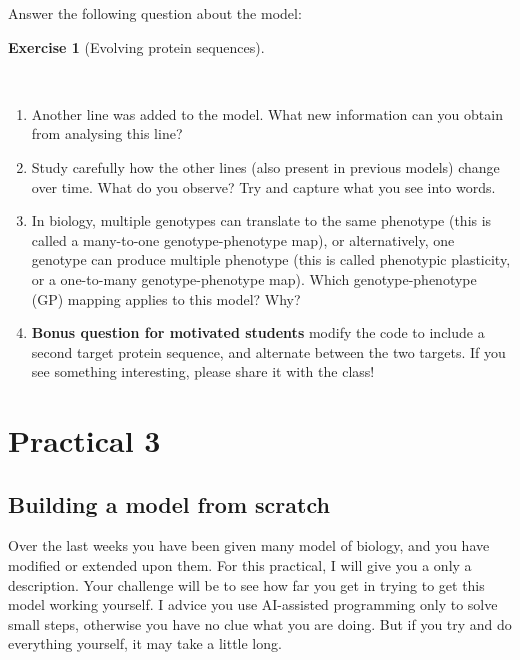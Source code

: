 \documentclass[
  letterpaper,
  DIV=11,
  numbers=noendperiod]{scrreprt}
\providecommand{\tightlist}{%
  \setlength{\itemsep}{0pt}\setlength{\parskip}{0pt}}\usepackage{longtable,booktabs,array}
\theoremstyle{definition}
\newtheorem{exercise}{Exercise}[chapter]
\theoremstyle{remark}
\begin{document}
Answer the following question about the model:

\begin{exercise}[Evolving protein
sequences]\protect\hypertarget{exr-evolving-proteins}{}\label{exr-evolving-proteins}

~

\begin{enumerate}
\def\labelenumi{\alph{enumi}.}
\tightlist
\item
  Another line was added to the model. What new information can you
  obtain from analysing this line?
\item
  Study carefully how the other lines (also present in previous models)
  change over time. What do you observe? Try and capture what you see
  into words.
\item
  In biology, multiple genotypes can translate to the same phenotype
  (this is called a many-to-one genotype-phenotype map), or
  alternatively, one genotype can produce multiple phenotype (this is
  called phenotypic plasticity, or a one-to-many genotype-phenotype
  map). Which genotype-phenotype (GP) mapping applies to this model?
  Why?
\item
  \textbf{Bonus question for motivated students} modify the code to
  include a second target protein sequence, and alternate between the
  two targets. If you see something interesting, please share it with
  the class!
\end{enumerate}

\end{exercise}

\chapter{Practical 3}\label{practical-3-1}

\section{Building a model from
scratch}\label{building-a-model-from-scratch}

Over the last weeks you have been given many model of biology, and you
have modified or extended upon them. For this practical, I will give you
a only a description. Your challenge will be to see how far you get in
trying to get this model working yourself. I advice you use AI-assisted
programming only to solve small steps, otherwise you have no clue what
you are doing. But if you try and do everything yourself, it may take a
little long.
\end{document}
